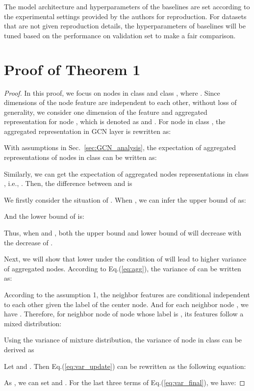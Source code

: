The model architecture and hyperparameters of the baselines are set according to the experimental settings provided by the authors for reproduction. For datasets that are not given reproduction details, the hyperparameters of baselines will be tuned based on the performance on validation set to make a fair comparison.

\section{Proof of Theorem 1}
\label{app:theorem1}
\begin{proof}
In this proof, we focus on nodes in class  and class , where .
Since dimensions of the node feature are independent to each other, without loss of generality, we consider one dimension of the feature and aggregated representation for node , which is denoted as  and .
For node  in class , the aggregated representation  in GCN layer is rewritten as: 
   
With assumptions in Sec.~\ref{sec:GCN_analysis}, the expectation of aggregated representations of nodes in class  can be written as:

Similarly, we can get the expectation of aggregated nodes representations in class , i.e., . Then, the difference between  and  is 


We firstly consider the situation of . When , we can infer the upper bound of  as:


And the lower bound of  is:

Thus, when  and ,  both the upper bound and lower bound of  will decrease with the decrease of .

Next, we will show that lower  under the condition of  will lead to higher variance of aggregated nodes. According to Eq.(\ref{eq:agg}), the variance of  can be written as:

According to the assumption 1, the neighbor features are conditional independent to each other given the label of the center node. And for each neighbor node , we have .
Therefore, for neighbor node  of node  whose label is , its features follow a mixed distribution:

Using the variance of mixture distribution, the variance of node  in class  can be derived as

Let  and . 
Then Eq.(\ref{eq:var_update}) can be rewritten as the following equation:

As , we can set  and . For the last three terms of Eq.(\ref{eq:var_final}), we have:


\end{proof}
